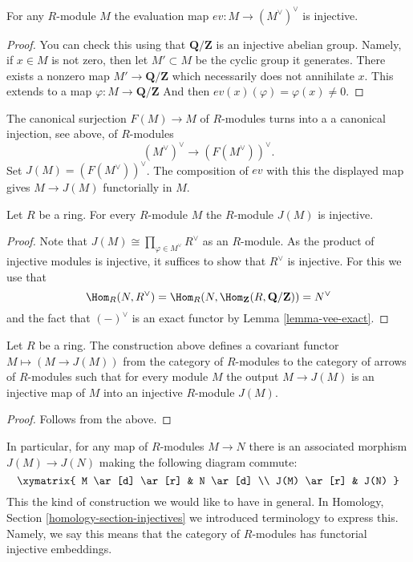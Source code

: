 \begin{lemma}
\label{lemma-ev-injective}
For any $R$-module $M$ the evaluation map
$ev : M \to (M^\vee)^\vee$ is injective.
\end{lemma}

\begin{proof}
You can check this using that $\mathbf{Q}/\mathbf{Z}$ is an injective
abelian group. Namely, if $x \in M$ is not zero, then let
$M' \subset M$ be the cyclic group it generates. There exists
a nonzero map $M' \to \mathbf{Q}/\mathbf{Z}$ which necessarily does
not annihilate $x$. This extends to
a map $\varphi : M \to \mathbf{Q}/\mathbf{Z}$
And then $ev(x)(\varphi) = \varphi(x) \not = 0$.
\end{proof}

\noindent
The canonical surjection $F(M) \to M$ of $R$-modules turns into a
a canonical injection, see above, of $R$-modules
$$
(M^\vee)^\vee \longrightarrow (F(M^\vee))^\vee.
$$
Set $J(M) = (F(M^\vee))^\vee$. The composition of $ev$ with this
the displayed map gives $M \to J(M)$ functorially in $M$.

\begin{lemma}
\label{lemma-JM-injective}
Let $R$ be a ring. For every $R$-module $M$ the
$R$-module $J(M)$ is injective.
\end{lemma}

\begin{proof}
Note that $J(M) \cong \prod_{\varphi \in M^\vee} R^\vee$ as an $R$-module.
As the product of injective modules is injective, it suffices to
show that $R^\vee$ is injective. For this we use that
$$
\Hom_R(N, R^\vee) =
\Hom_R(N, \Hom_{\mathbf{Z}}(R, \mathbf{Q}/\mathbf{Z})) =
N^\vee
$$
and the
fact that $(-)^\vee$ is an exact functor by Lemma
\ref{lemma-vee-exact}.
\end{proof}

\begin{lemma}
\label{lemma-injectives-modules}
Let $R$ be a ring.
The construction above defines a covariant functor
$M \mapsto (M \to J(M))$ from the category of
$R$-modules to the category of arrows of $R$-modules
such that for every module $M$ the output
$M \to J(M)$ is an injective map of $M$ into
an injective $R$-module $J(M)$.
\end{lemma}

\begin{proof}
Follows from the above.
\end{proof}

\noindent
In particular, for any map of $R$-modules $M \to N$
there is an associated morphism $J(M) \to J(N)$
making the following diagram commute:
$$
\xymatrix{
M \ar[d] \ar[r] & N \ar[d] \\
J(M) \ar[r] & J(N) }
$$
This the kind of construction we would like to have in general.
In Homology, Section \ref{homology-section-injectives}
we introduced terminology to express this. Namely,
we say this means that the category of $R$-modules
has functorial injective embeddings.











